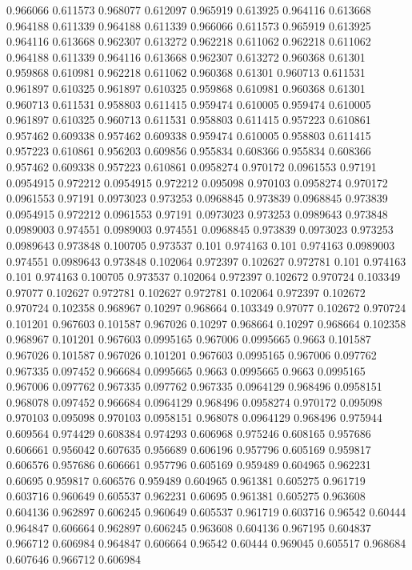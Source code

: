 0.966066 0.611573
0.968077 0.612097
0.965919 0.613925
0.964116 0.613668
0.964188 0.611339
0.964188 0.611339
0.966066 0.611573
0.965919 0.613925
0.964116 0.613668
0.962307 0.613272
0.962218 0.611062
0.962218 0.611062
0.964188 0.611339
0.964116 0.613668
0.962307 0.613272
0.960368 0.61301
0.959868 0.610981
0.962218 0.611062
0.960368 0.61301
0.960713 0.611531
0.961897 0.610325
0.961897 0.610325
0.959868 0.610981
0.960368 0.61301
0.960713 0.611531
0.958803 0.611415
0.959474 0.610005
0.959474 0.610005
0.961897 0.610325
0.960713 0.611531
0.958803 0.611415
0.957223 0.610861
0.957462 0.609338
0.957462 0.609338
0.959474 0.610005
0.958803 0.611415
0.957223 0.610861
0.956203 0.609856
0.955834 0.608366
0.955834 0.608366
0.957462 0.609338
0.957223 0.610861
0.0958274 0.970172
0.0961553 0.97191
0.0954915 0.972212
0.0954915 0.972212
0.095098 0.970103
0.0958274 0.970172
0.0961553 0.97191
0.0973023 0.973253
0.0968845 0.973839
0.0968845 0.973839
0.0954915 0.972212
0.0961553 0.97191
0.0973023 0.973253
0.0989643 0.973848
0.0989003 0.974551
0.0989003 0.974551
0.0968845 0.973839
0.0973023 0.973253
0.0989643 0.973848
0.100705 0.973537
0.101 0.974163
0.101 0.974163
0.0989003 0.974551
0.0989643 0.973848
0.102064 0.972397
0.102627 0.972781
0.101 0.974163
0.101 0.974163
0.100705 0.973537
0.102064 0.972397
0.102672 0.970724
0.103349 0.97077
0.102627 0.972781
0.102627 0.972781
0.102064 0.972397
0.102672 0.970724
0.102358 0.968967
0.10297 0.968664
0.103349 0.97077
0.102672 0.970724
0.101201 0.967603
0.101587 0.967026
0.10297 0.968664
0.10297 0.968664
0.102358 0.968967
0.101201 0.967603
0.0995165 0.967006
0.0995665 0.9663
0.101587 0.967026
0.101587 0.967026
0.101201 0.967603
0.0995165 0.967006
0.097762 0.967335
0.097452 0.966684
0.0995665 0.9663
0.0995665 0.9663
0.0995165 0.967006
0.097762 0.967335
0.097762 0.967335
0.0964129 0.968496
0.0958151 0.968078
0.097452 0.966684
0.0964129 0.968496
0.0958274 0.970172
0.095098 0.970103
0.095098 0.970103
0.0958151 0.968078
0.0964129 0.968496
0.975944 0.609564
0.974429 0.608384
0.974293 0.606968
0.975246 0.608165
0.957686 0.606661
0.956042 0.607635
0.956689 0.606196
0.957796 0.605169
0.959817 0.606576
0.957686 0.606661
0.957796 0.605169
0.959489 0.604965
0.962231 0.60695
0.959817 0.606576
0.959489 0.604965
0.961381 0.605275
0.961719 0.603716
0.960649 0.605537
0.962231 0.60695
0.961381 0.605275
0.963608 0.604136
0.962897 0.606245
0.960649 0.605537
0.961719 0.603716
0.96542 0.60444
0.964847 0.606664
0.962897 0.606245
0.963608 0.604136
0.967195 0.604837
0.966712 0.606984
0.964847 0.606664
0.96542 0.60444
0.969045 0.605517
0.968684 0.607646
0.966712 0.606984
